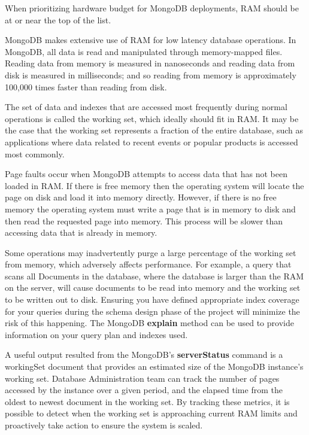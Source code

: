 \documentclass[9pt,twocolumn,twoside]{styles/osajnl}
\begin{document}
\cite{www-mongo4} When prioritizing hardware budget for MongoDB deployments, RAM should be at or near the top of the list.

MongoDB makes extensive use of RAM for low latency database operations. In MongoDB, all data is read and manipulated through memory-mapped files. Reading data from memory is measured in nanoseconds and reading data from disk is measured in milliseconds; and so reading from memory is approximately 100,000 times faster than reading from disk.

The set of data and indexes that are accessed most frequently during normal operations is called the working set, which ideally should fit in RAM. It may be the case that the working set represents a fraction of the entire database, such as applications where data related to recent events or popular products is accessed most commonly.

Page faults occur when MongoDB attempts to access data that has not been loaded in RAM. If there is free memory then the operating system will locate the page on disk and load it into memory directly. However, if there is no free memory the operating system must write a page that is in memory to disk and then read the requested page into memory. This process will be slower than accessing data that is already in memory.

Some operations may inadvertently purge a large percentage of the working set from memory, which adversely affects performance. For example, a query that scans all Documents in the database, where the database is larger than the RAM on the server, will cause documents to be read into memory and the working set to be written out to disk. Ensuring you have defined appropriate index coverage for your queries during the schema design phase of the project will minimize the risk of this happening. The MongoDB {\bfseries explain} method can be used to provide information on your query plan and indexes used.

A useful output resulted from the MongoDB’s {\bfseries serverStatus} command is a workingSet document that provides an estimated size of the MongoDB instance’s working set. Database Administration team can track the number of pages accessed by the instance over a given period, and the elapsed time from the oldest to newest document in the working set. By tracking these metrics, it is possible to detect when the working set is approaching current RAM limits and proactively take action to ensure the system is scaled.
\end{document}
